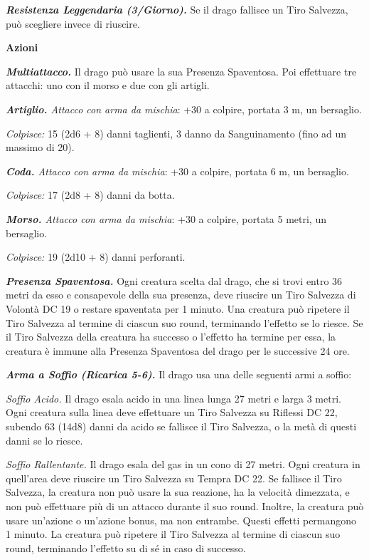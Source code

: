 \begin{multicols}{2}
	\textit{\textbf{Resistenza Leggendaria (3/Giorno).}} Se il drago fallisce un Tiro Salvezza, può scegliere invece di riuscire.

	\textbf{Azioni}

	\textit{\textbf{Multiattacco.}} Il drago può usare la sua Presenza Spaventosa. Poi effettuare tre attacchi: uno con il morso e due con gli artigli.

	\textit{\textbf{Artiglio.} Attacco con arma da mischia}: +30 a colpire, portata 3 m, un bersaglio.

	\textit{Colpisce:} 15 (2d6 + 8) danni taglienti, 3 danno da Sanguinamento (fino ad un massimo di 20).

	\textit{\textbf{Coda.} Attacco con arma da mischia}: +30 a colpire, portata 6 m, un bersaglio.

	\textit{Colpisce:} 17 (2d8 + 8) danni da botta.

	\textit{\textbf{Morso.} Attacco con arma da mischia}: +30 a colpire, portata 5 metri, un bersaglio.

	\textit{Colpisce:} 19 (2d10 + 8) danni perforanti.

	\textit{\textbf{Presenza Spaventosa.}} Ogni creatura scelta dal drago, che si trovi entro 36 metri da esso e consapevole della sua presenza, deve riuscire un Tiro Salvezza di Volontà DC 19 o restare spaventata per 1 minuto. Una creatura può ripetere il Tiro Salvezza al termine di ciascun suo round, terminando l'effetto se lo riesce. Se il Tiro Salvezza della creatura ha successo o l'effetto ha termine per essa, la creatura è immune alla Presenza Spaventosa del drago per le successive 24 ore.

	\textit{\textbf{Arma a Soffio (Ricarica 5-6).}} Il drago usa una delle seguenti armi a soffio:

	\textit{Soffio Acido.} Il drago esala acido in una linea lunga 27 metri e larga 3 metri. Ogni creatura sulla linea deve effettuare un Tiro Salvezza su Riflessi DC 22, subendo 63 (14d8) danni da acido se fallisce il Tiro Salvezza, o la metà di questi danni se lo riesce.

	\textit{Soffio Rallentante.} Il drago esala del gas in un cono di 27 metri. Ogni creatura in quell'area deve riuscire un Tiro Salvezza su Tempra DC 22. Se fallisce il Tiro Salvezza, la creatura non può usare la sua reazione, ha la velocità dimezzata, e non può effettuare più di un attacco durante il suo round. Inoltre, la creatura può usare un'azione o un'azione bonus, ma non entrambe. Questi effetti permangono 1 minuto. La creatura può ripetere il Tiro Salvezza al termine di ciascun suo round, terminando l'effetto su di sé in caso di successo.


\end{multicols}
